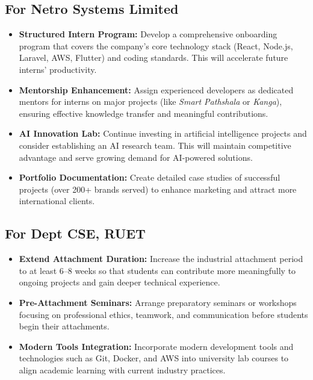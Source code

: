 \documentclass[12pt,a4paper]{report}
\let\oldcite\cite
\renewcommand{\cite}[1]{\textcolor{impactcolor}{\oldcite{#1}}}
\newenvironment{coloritemize}
{\begin{itemize}[label=\textcolor{primaryblue}{$\bullet$}]}
{\end{itemize}}
\begin{document}
\subsection{For Netro Systems Limited}
\begin{coloritemize}
    \item \textcolor{skillcolor}{\textbf{Structured Intern Program:}} Develop a comprehensive onboarding program that covers the company’s core technology stack (React, Node.js, Laravel, AWS, Flutter) and coding standards. This will accelerate future interns’ productivity.
    \item \textcolor{skillcolor}{\textbf{Mentorship Enhancement:}} Assign experienced developers as dedicated mentors for interns on major projects (like \textit{Smart Pathshala} or \textit{Kanga}), ensuring effective knowledge transfer and meaningful contributions.
    \item \textcolor{skillcolor}{\textbf{AI Innovation Lab:}} Continue investing in artificial intelligence projects and consider establishing an AI research team. This will maintain competitive advantage and serve growing demand for AI-powered solutions.
    \item \textcolor{skillcolor}{\textbf{Portfolio Documentation:}} Create detailed case studies of successful projects (over 200+ brands served) to enhance marketing and attract more international clients.
\end{coloritemize}

\subsection{For Dept CSE, RUET}

\begin{coloritemize}
    \item \textcolor{skillcolor}{\textbf{Extend Attachment Duration:}} Increase the industrial attachment period to at least 6–8 weeks so that students can contribute more meaningfully to ongoing projects and gain deeper technical experience.
    \item \textcolor{skillcolor}{\textbf{Pre-Attachment Seminars:}} Arrange preparatory seminars or workshops focusing on professional ethics, teamwork, and communication before students begin their attachments.
    \item \textcolor{skillcolor}{\textbf{Modern Tools Integration:}} Incorporate modern development tools and technologies such as Git, Docker, and AWS \cite{ref7} into university lab courses to align academic learning with current industry practices.
\end{coloritemize}
\end{document}
